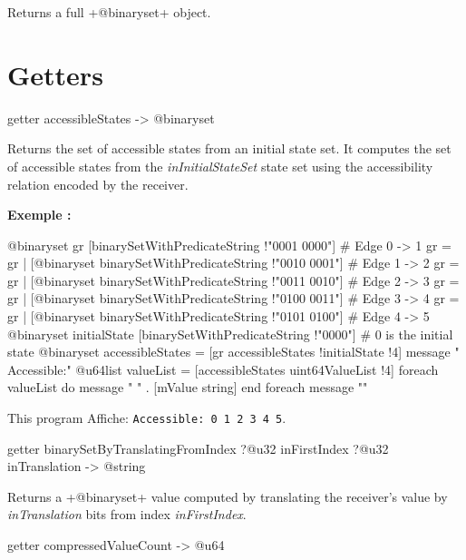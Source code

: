 Returns a full \ggsq+@binaryset+ object.


\section{Getters}




\begin{galgas4box}
getter accessibleStates -> @binaryset
\end{galgas4box}

Returns the set of accessible states from an initial state set. It computes the set of accessible states from the \emph{inInitialStateSet} state set using the accessibility relation encoded by the receiver.

\textbf{Exemple :}
\begin{galgas4}
@binaryset gr [binarySetWithPredicateString !"0001 0000"] # Edge 0 -> 1
gr = gr | [@binaryset binarySetWithPredicateString !"0010 0001"] # Edge 1 -> 2
gr = gr | [@binaryset binarySetWithPredicateString !"0011 0010"] # Edge 2 -> 3
gr = gr | [@binaryset binarySetWithPredicateString !"0100 0011"] # Edge 3 -> 4
gr = gr | [@binaryset binarySetWithPredicateString !"0101 0100"] # Edge 4 -> 5
@binaryset initialState [binarySetWithPredicateString !"0000"] # 0 is the initial state
@binaryset accessibleStates = [gr accessibleStates !initialState !4]
message " Accessible:"
@u64list valueList = [accessibleStates uint64ValueList !4]
foreach valueList do
  message " " . [mValue string]
end foreach
message "\n"
\end{galgas4}


This program Affiche: \texttt{Accessible: 0 1 2 3 4 5}.




\begin{galgas4box}
getter binarySetByTranslatingFromIndex ?@u32 inFirstIndex ?@u32 inTranslation -> @string
\end{galgas4box}


Returns a \ggsq+@binaryset+ value computed by translating the receiver's value by \emph{inTranslation} bits from index \emph{inFirstIndex}.




\begin{galgas4box}
getter compressedValueCount -> @u64
\end{galgas4box}

